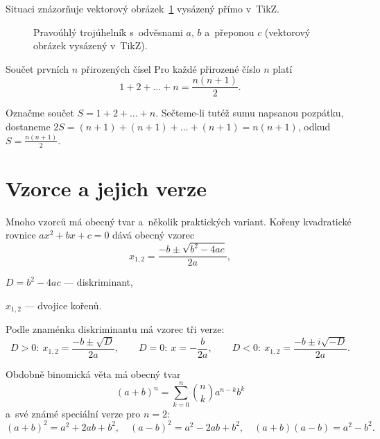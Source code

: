 \documentclass[11pt, a4paper, oneside]{book}
\begin{document}
Situaci znázorňuje vektorový obrázek~\ref{fig:pythagoras} vysázený přímo v~TikZ.

\begin{figure}[htbp]
\centering
{}
\caption{Pravoúhlý trojúhelník s~odvěsnami $a$, $b$ a~přeponou $c$
(vektorový obrázek vysázený v~TikZ).}
\label{fig:pythagoras}
\end{figure}

\begin{veta}{Součet prvních $n$ přirozených čísel}
Pro každé přirozené číslo $n$ platí
\[ 1 + 2 + \dots + n = \frac{n(n+1)}{2}. \]
\end{veta}

\begin{dukaz}
Označme součet $S = 1 + 2 + \dots + n$. Sečteme-li tutéž sumu napsanou
pozpátku, dostaneme $2S = (n+1) + (n+1) + \dots + (n+1) = n(n+1)$, odkud
$S = \frac{n(n+1)}{2}$.
\end{dukaz}

\section{Vzorce a jejich verze}

Mnoho vzorců má obecný tvar a~několik praktických variant. Kořeny kvadratické
rovnice $a x^2 + b x + c = 0$ dává obecný vzorec
\[ x_{1,2} = \frac{-b \pm \sqrt{b^2 - 4ac}}{2a}, \]
\begin{kde}
  \item $D = b^2 - 4ac$ — diskriminant,
  \item $x_{1,2}$ — dvojice kořenů.
\end{kde}
Podle znaménka diskriminantu má vzorec tři verze:
\[
  D > 0:\ x_{1,2} = \frac{-b \pm \sqrt{D}}{2a}, \qquad
  D = 0:\ x = -\frac{b}{2a}, \qquad
  D < 0:\ x_{1,2} = \frac{-b \pm i\sqrt{-D}}{2a}.
\]

Obdobně binomická věta má obecný tvar
\[ (a+b)^n = \sum_{k=0}^{n} \binom{n}{k} a^{n-k} b^k \]
a~své známé speciální verze pro $n = 2$:
\[
  (a+b)^2 = a^2 + 2ab + b^2, \quad
  (a-b)^2 = a^2 - 2ab + b^2, \quad
  (a+b)(a-b) = a^2 - b^2.
\]
\end{document}
